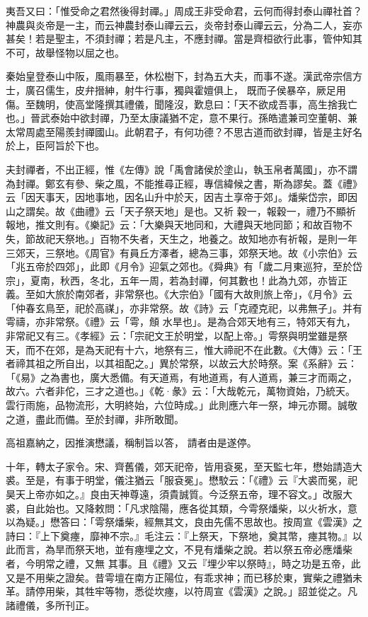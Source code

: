 \begin{pinyinscope}
 夷吾又曰：「惟受命之君然後得封禪。」周成王非受命君，云何而得封泰山禪社首？神農與炎帝是一主，而云神農封泰山禪云云，炎帝封泰山禪云云，分為二人，妄亦甚矣！若是聖主，不須封禪；若是凡主，不應封禪。當是齊桓欲行此事，管仲知其不可，故舉怪物以屈之也。



 秦始皇登泰山中阪，風雨暴至，休松樹下，封為五大夫，而事不遂。漢武帝宗信方士，廣召儒生，皮弁搢紳，射牛行事，獨與霍嬗俱上，
 既而子侯暴卒，厥足用傷。至魏明，使高堂隆撰其禮儀，聞隆沒，歎息曰：「天不欲成吾事，高生捨我亡也。」晉武泰始中欲封禪，乃至太康議猶不定，意不果行。孫皓遣兼司空董朝、兼太常周處至陽羨封禪國山。此朝君子，有何功德？不思古道而欲封禪，皆是主好名於上，臣阿旨於下也。



 夫封禪者，不出正經，惟《左傳》說「禹會諸侯於塗山，執玉帛者萬國」，亦不謂為封禪。鄭玄有參、柴之風，不能推尋正經，專信緯候之書，斯為謬矣。蓋《禮》云「因天事天，因地事地，因名山升中於天，因吉土享帝于郊」。燔柴岱宗，即因山之謂矣。故《曲禮》云「天子祭天地」是也。又祈
 穀一，報穀一，禮乃不顯祈報地，推文則有。《樂記》云：「大樂與天地同和，大禮與天地同節；和故百物不失，節故祀天祭地。」百物不失者，天生之，地養之。故知地亦有祈報，是則一年三郊天，三祭地。《周官》有員丘方澤者，總為三事，郊祭天地。故《小宗伯》云「兆五帝於四郊」，此即《月令》迎氣之郊也。《舜典》有「歲二月東巡狩，至於岱宗」，夏南，秋西，冬北，五年一周，若為封禪，何其數也！此為九郊，亦皆正義。至如大旅於南郊者，非常祭也。《大宗伯》「國有大故則旅上帝」，《月令》云「仲春玄鳥至，祀於高禖」，亦非常祭。故《詩》云「克禋克祀，以弗無子」。并有雩禱，亦非常祭。《禮》云「雩，頠
 水旱也」。是為合郊天地有三，特郊天有九，非常祀又有三。《孝經》云：「宗祀文王於明堂，以配上帝。」雩祭與明堂雖是祭天，而不在郊，是為天祀有十六，地祭有三，惟大禘祀不在此數。《大傳》云：「王者禘其祖之所自出，以其祖配之。」異於常祭，以故云大於時祭。案《系辭》云：「《易》之為書也，廣大悉備。有天道焉，有地道焉，有人道焉，兼三才而兩之，故六。六者非佗，三才之道也。」《乾·彖》云：「大哉乾元，萬物資始，乃統天。雲行雨施，品物流形，大明終始，六位時成。」此則應六年一祭，坤元亦爾。誠敬之道，盡此而備。至於封禪，非所敢聞。



 高祖嘉納之，因推演懋議，稱制旨以答，
 請者由是遂停。



 十年，轉太子家令。宋、齊舊儀，郊天祀帝，皆用袞冕，至天監七年，懋始請造大裘。至是，有事于明堂，儀注猶云「服袞冕」。懋駮云：「《禮》云『大裘而冕，祀昊天上帝亦如之。』良由天神尊遠，須貴誠質。今泛祭五帝，理不容文。」改服大裘，自此始也。又降敕問：「凡求陰陽，應各從其類，今雩祭燔柴，以火祈水，意以為疑。」懋答曰：「雩祭燔柴，經無其文，良由先儒不思故也。按周宣《雲漢》之詩曰：『上下奠瘞，靡神不宗。』毛注云：『上祭天，下祭地，奠其幣，瘞其物。』以此而言，為旱而祭天地，並有瘞埋之文，不見有燔柴之說。若以祭五帝必應燔柴者，今明常之禮，又無
 其事。且《禮》又云『埋少牢以祭時』，時之功是五帝，此又是不用柴之證矣。昔雩壇在南方正陽位，有乖求神；而已移於東，實柴之禮猶未革。請停用柴，其牲牢等物，悉從坎瘞，以符周宣《雲漢》之說。」詔並從之。凡諸禮儀，多所刊正。




\end{pinyinscope}
